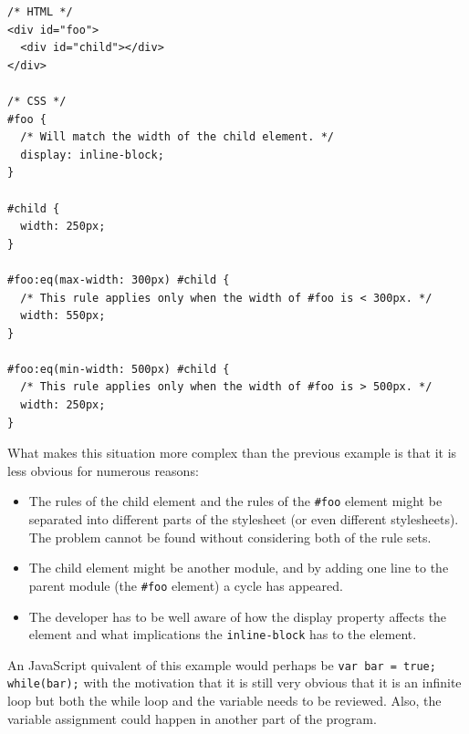 \documentclass[a4paper,11pt]{kth-mag}
\newcommand{\code}[1]{\texttt{#1}}
\begin{document}
          \begin{lstlisting}[caption={Example of indirect cyclic rules.}, captionpos=b, label={code:cyclic-2}]
/* HTML */
<div id="foo">
  <div id="child"></div>
</div>

/* CSS */
#foo {
  /* Will match the width of the child element. */
  display: inline-block;
}

#child {
  width: 250px;
}

#foo:eq(max-width: 300px) #child {
  /* This rule applies only when the width of #foo is < 300px. */
  width: 550px;
}

#foo:eq(min-width: 500px) #child {
  /* This rule applies only when the width of #foo is > 500px. */
  width: 250px;
}
          \end{lstlisting}
          What makes this situation more complex than the previous example is that it is less obvious for numerous reasons:
          \begin{itemize}
            \item The rules of the child element and the rules of the \code{\#foo} element might be separated into different parts of the stylesheet (or even different stylesheets).
            The problem cannot be found without considering both of the rule sets.
            \item The child element might be another module, and by adding one line to the parent module (the \code{\#foo} element) a cycle has appeared.
            \item The developer has to be well aware of how the display property affects the element and what implications the \code{inline-block} has to the element.
          \end{itemize}
          An JavaScript quivalent of this example would perhaps be \code{var bar = true; while(bar);} with the motivation that it is still very obvious that it is an infinite loop but both the while loop and the variable needs to be reviewed.
          Also, the variable assignment could happen in another part of the program.
\end{document}
